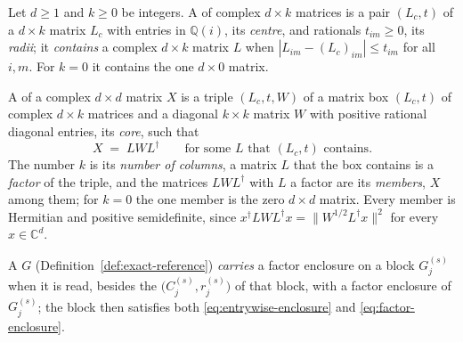 \begin{definition}\label{def:factor-enclosure}
Let $d\ge1$ and $k\ge0$ be integers. A
 of complex
$d\times k$ matrices is a pair $(L_c,t)$ of a $d\times k$ matrix $L_c$ with
entries in $\mathbb{Q}(i)$, its \emph{centre}, and rationals $t_{im}\ge0$,
its \emph{radii}; it \emph{contains} a complex $d\times k$ matrix $L$ when
$|L_{im}-(L_c)_{im}|\le t_{im}$ for all $i,m$. For $k=0$ it contains the one
$d\times0$ matrix.

A
 of a complex $d\times d$ matrix $X$ is a triple $(L_c,t,W)$ of a
matrix box $(L_c,t)$ of complex $d\times k$ matrices and a diagonal
$k\times k$ matrix $W$ with positive rational diagonal entries, its
\emph{core}, such that
\begin{equation}\label{eq:factor-enclosure}
  X\;=\;LWL^{\dagger}\qquad\text{for some }L\text{ that }(L_c,t)\text{ contains}.
\end{equation}
The number $k$ is its \emph{number of columns}, a matrix $L$ that the box
contains is a \emph{factor} of the triple, and the matrices $LWL^{\dagger}$
with $L$ a factor are its \emph{members}, $X$ among them; for $k=0$ the one
member is the zero $d\times d$ matrix. Every member is Hermitian and positive
semidefinite, since $x^{\dagger}LWL^{\dagger}x=\|W^{1/2}L^{\dagger}x\|^{2}$
for every $x\in\mathbb{C}^{d}$.

A  $G$ (Definition~\ref{def:exact-reference}) \emph{carries} a
factor enclosure on a block $G^{(s)}_j$ when it is read, besides the
 $\big(C^{(s)}_j,r^{(s)}_j\big)$ of that block, with
a factor enclosure of $G^{(s)}_j$; the block then satisfies both
\eqref{eq:entrywise-enclosure} and \eqref{eq:factor-enclosure}.
\end{definition}
